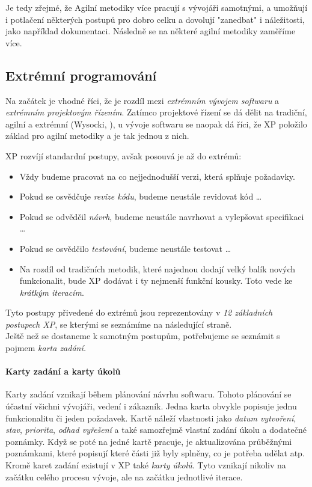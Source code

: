 Je tedy zřejmé, že Agilní metodiky více pracují s vývojáři samotnými, a umožňují i potlačení některých postupů pro dobro celku a dovolují "zanedbat" i náležitosti, jako například dokumentaci. Následně se na některé agilní metodiky zaměříme více.


\subsection{Extrémní programování} \label{methods:XP}

Na začátek je vhodné říci, že je rozdíl mezi \emph{extrémním vývojem softwaru} a \emph{extrémním projektovým řízením}. Zatímco projektové řízení se dá dělit na tradiční, agilní a extrémní (Wysocki, \cite{wysocki}), u vývoje softwaru se naopak dá říci, že XP položilo základ pro agilní metodiky a je tak jednou z nich.

XP rozvíjí standardní postupy, avšak posouvá je až do extrémů:
\begin{itemize}
	\item Vždy budeme pracovat na co nejjednodušší verzi, která splňuje požadavky.
	\item Pokud se osvědčuje \emph{revize kódu}, budeme neustále revidovat kód \ldots
	\item Pokud se odvědčil \emph{návrh}, budeme neustále navrhovat a vylepšovat specifikaci \ldots
	\item Pokud se osvědčilo \emph{testování}, budeme neustále testovat \ldots
	\item Na rozdíl od tradičních metodik, které najednou dodají velký balík nových funkcionalit, bude XP dodávat i ty nejmenší funkční kousky. Toto vede ke \emph{krátkým iteracím}.
\end{itemize}

Tyto postupy přivedené do extrémů jsou reprezentovány v \emph{12 základních postupech XP}, se kterými se seznámíme na následující straně.\\
Ještě než se dostaneme k samotným postupům, potřebujeme se seznámit s pojmem \emph{karta zadání.}

\paragraph{Karty zadání a karty úkolů} \label{methods:XP:issues}
Karty zadání vznikají během plánování návrhu softwaru. Tohoto plánování se účastní všichni vývojáři, vedení i zákazník. Jedna karta obvykle popisuje jednu funkcionalitu či jeden požadavek. Kartě náleží vlastnosti jako \emph{datum vytvoření}, \emph{stav}, \emph{priorita}, \emph{odhad vyřešení} a také samozřejmě vlastní zadání úkolu a dodatečné poznámky. Když se poté na jedné kartě pracuje, je aktualizována průběžnými poznámkami, které popisují které části již byly splněny, co je potřeba udělat atp.\\
Kromě karet zadání existují v XP také \emph{karty úkolů}. Tyto vznikají nikoliv na začátku celého procesu vývoje, ale na začátku jednotlivé iterace.

